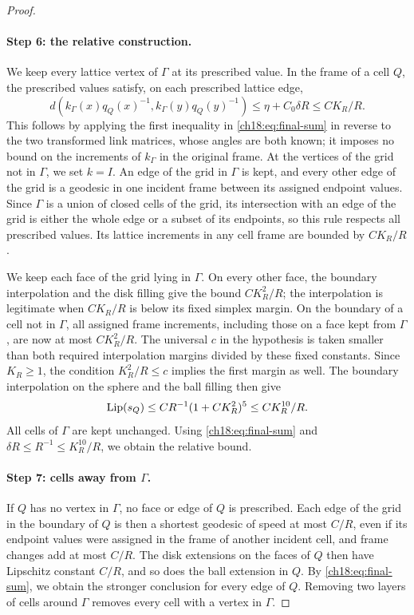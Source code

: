\begin{proof}
\paragraph{Step 6: the relative construction.}
We keep every lattice vertex of $\Gamma$ at its prescribed value. In the frame of a cell $Q$, the prescribed values satisfy, on each prescribed lattice edge,
\begin{equation}\label{ch18:eq:prescribed-increments}
 d(k_\Gamma(x)q_Q(x)^{-1},k_\Gamma(y)q_Q(y)^{-1})
       \le\eta+C_0\delta R\le C K_R/R.
\end{equation}
This follows by applying the first inequality in \eqref{ch18:eq:final-sum} in reverse to the two transformed link matrices, whose angles are both known; it imposes no bound on the increments of $k_\Gamma$ in the original frame. At the vertices of the grid not in $\Gamma$, we set $k=I$. An edge of the grid in $\Gamma$ is kept, and every other edge of the grid is a geodesic in one incident frame between its assigned endpoint values. Since $\Gamma$ is a union of closed cells of the grid, its intersection with an edge of the grid is either the whole edge or a subset of its endpoints, so this rule respects all prescribed values. Its lattice increments in any cell frame are bounded by $CK_R/R$.

We keep each face of the grid lying in $\Gamma$. On every other face, the boundary interpolation and the disk filling give the bound $CK_R^2/R$; the interpolation is legitimate when $CK_R/R$ is below its fixed simplex margin. On the boundary of a cell not in $\Gamma$, all assigned frame increments, including those on a face kept from $\Gamma$, are now at most $CK_R^2/R$. The universal $c$ in the hypothesis is taken smaller than both required interpolation margins divided by these fixed constants. Since $K_R\ge1$, the condition $K_R^2/R\le c$ implies the first margin as well. The boundary interpolation on the sphere and the ball filling then give
\[
 \operatorname{Lip}(s_Q)\le C R^{-1}(1+C K_R^2)^5\le C K_R^{10}/R.
\]
All cells of $\Gamma$ are kept unchanged. Using \eqref{ch18:eq:final-sum} and $\delta R\le R^{-1}\le K_R^{10}/R$, we obtain the relative bound.

\paragraph{Step 7: cells away from $\Gamma$.}
If $Q$ has no vertex in $\Gamma$, no face or edge of $Q$ is prescribed. Each edge of the grid in the boundary of $Q$ is then a shortest geodesic of speed at most $C/R$, even if its endpoint values were assigned in the frame of another incident cell, and frame changes add at most $C/R$. The disk extensions on the faces of $Q$ then have Lipschitz constant $C/R$, and so does the ball extension in $Q$. By \eqref{ch18:eq:final-sum}, we obtain the stronger conclusion for every edge of $Q$. Removing two layers of cells around $\Gamma$ removes every cell with a vertex in $\Gamma$.


\end{proof}
